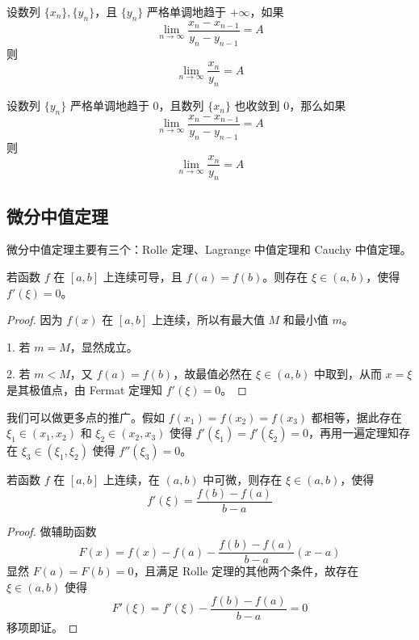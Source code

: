 \begin{theorem}
	设数列 $\{x_n\},\{y_n\}$，且 $\{y_n\}$ 严格单调地趋于 $+\infty$，如果
	\[\lim_{n\to \infty}\frac{x_n-x_{n-1}}{y_n-y_{n-1}}=A\]
	则
	\[\lim_{n\to \infty} \frac{x_n}{y_n} = A\]
\end{theorem}

\begin{theorem}
	设数列 $\{y_n\}$ 严格单调地趋于 $0$，且数列 $\{x_n\}$ 也收敛到 $0$，那么如果
	\[\lim_{n\to \infty}\frac{x_n-x_{n-1}}{y_n-y_{n-1}}=A\]
	则
	\[\lim_{n\to \infty} \frac{x_n}{y_n} = A\]
\end{theorem}

\subsection{微分中值定理}

微分中值定理主要有三个：Rolle 定理、Lagrange 中值定理和 Cauchy 中值定理。

\begin{theorem}
	若函数 $f$ 在 $[a,b]$ 上连续可导，且 $f(a)=f(b)$。则存在 $\xi\in(a,b)$，使得 $f'(\xi)=0$。
\end{theorem}

\begin{proof}
	因为 $f(x)$ 在 $[a,b]$ 上连续，所以有最大值 $M$ 和最小值 $m$。

	1. 若 $m=M$，显然成立。

	2. 若 $m < M$，又 $f(a) = f(b)$，故最值必然在 $\xi \in (a, b)$ 中取到，从而 $x=\xi$ 是其极值点，由 Fermat 定理知 $f'(\xi) = 0$。
\end{proof}

我们可以做更多点的推广。假如 $f(x_1) = f(x_2) = f(x_3)$ 都相等，据此存在 $\xi_1 \in (x_1, x_2)$ 和 $\xi_2 \in (x_2, x_3)$ 使得 $f'(\xi_1) = f'(\xi_2) = 0$，再用一遍定理知存在 $\xi_3 \in (\xi_1, \xi_2)$ 使得 $f''(\xi_3) = 0$。

\begin{theorem}[Lagrange 定理]
	若函数 $f$ 在 $[a,b]$ 上连续，在 $(a,b)$ 中可微，则存在 $\xi\in(a,b)$，使得
	\[ f'(\xi)=\frac{f(b)-f(a)}{b-a} \]
\end{theorem}

\begin{proof}
	做辅助函数
	\[ F(x) = f(x) - f(a) - \frac{f(b) - f(a)}{b - a}(x - a) \]
	显然 $F(a) = F(b) = 0$，且满足 Rolle 定理的其他两个条件，故存在 $\xi \in (a, b)$ 使得
	\[ F'(\xi) = f'(\xi) - \frac{f(b) - f(a)}{b - a} = 0 \]
	移项即证。
\end{proof}

